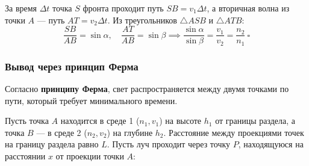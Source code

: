 \begin{center}
\end{center}
За время $\Delta t$ точка $S$ фронта проходит путь $SB = v_1 \Delta t$, а вторичная волна из точки $A$ --- путь $AT = v_2 \Delta t$. Из треугольников $\triangle ASB$ и $\triangle ATB$:
\[
\frac{SB}{AB} = \sin \alpha, \quad \frac{AT}{AB} = \sin \beta \implies \frac{\sin \alpha}{\sin \beta} = \frac{v_1}{v_2} = \frac{n_2}{n_1}\ \square
\]

\subsubsection{Вывод через принцип Ферма}

Согласно \textbf{принципу Ферма}, свет распространяется между двумя точками по пути, который требует минимального времени.

Пусть точка $A$ находится в среде 1 ($n_1, v_1$) на высоте $h_1$ от границы раздела, а точка $B$ --- в среде 2 ($n_2, v_2$) на глубине $h_2$. Расстояние между проекциями точек на границу раздела равно $L$. Пусть луч проходит через точку $P$, находящуюся на расстоянии $x$ от проекции точки $A$:

